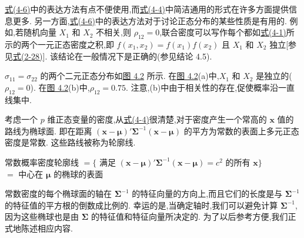 \hyperref[eq:4-6]{式(4-6)}中的表达方法有点不便使用,而\hyperref[eq:4-4]{式(4-4)}中简洁通用的形式在许多方面提供信息更多. 另一方面,\hyperref[eq:4-6]{式(4-6)}中的表达方法对于讨论正态分布的某些性质是有用的. 例如,若随机向量 $X_1$ 和 $X_2$ 不相关,则 $\rho_{12}=0$,联合密度可以写作每个都如\hyperref[eq:4-1]{式(4-1)}所示的两个一元正态密度之积,即 $f(x_1,x_2)=f(x_1)f(x_2)$ 且 $X_1$ 和 $X_2$ 独立[参见\hyperref[eq:2-28]{式(2-28)}]. 该结论在一般情况下是正确的(参见结论 4.5).

$\sigma_{11}=\sigma_{22}$ 的两个二元正态分布如\hyperref[fig:4.2]{图 4.2} 所示. 在\hyperref[fig:4.2]{图 4.2}(a)中,$X_1$ 和 $X_2$ 是独立的($\rho_{12}=0$). 在\hyperref[fig:4.2]{图 4.2}(b)中,$\rho_{12}=0.75$. 注意,(b)中由于相关性的存在,促使概率沿一直线集中.

\begin{mvfigure}
\label{fig:4.2}
\end{mvfigure}

考虑一个 $p$ 维正态变量的密度,从\hyperref[eq:4-4]{式(4-4)}很清楚,对于密度产生一个常高的 $\mathbf{x}$ 值的路线为椭球面. 即在距离 $(\mathbf{x}-\boldsymbol{\mu})'\boldsymbol{\Sigma}^{-1}(\mathbf{x}-\boldsymbol{\mu})$ 的平方为常数的表面上多元正态密度是常数. 这些路线被称为轮廓线.

\begin{center}
常数概率密度轮廓线 $=\{$ 满足 $(\mathbf{x}-\boldsymbol{\mu})'\boldsymbol{\Sigma}^{-1}(\mathbf{x}-\boldsymbol{\mu})=c^{2}$ 的所有 $\mathbf{x}\}$\\
$=$ 中心在 $\boldsymbol{\mu}$ 的椭球的表面
\end{center}

常数密度的每个椭球面的轴在 $\boldsymbol{\Sigma}^{-1}$ 的特征向量的方向上,而且它们的长度是与 $\boldsymbol{\Sigma}^{-1}$ 的特征值的平方根的倒数成比例的. 幸运的是,当确定轴时,我们可以避免计算 $\boldsymbol{\Sigma}^{-1}$,因为这些椭球也是由 $\boldsymbol{\Sigma}$ 的特征值和特征向量所决定的. 为了以后参考方便,我们正式地陈述相应内容.


